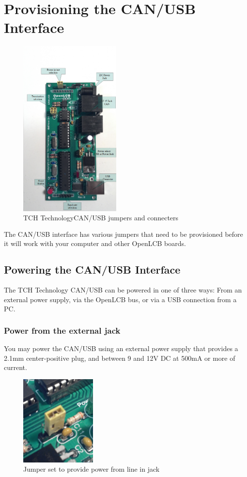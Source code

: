 \documentclass[11pt]{book}
\begin{document}
\chapter{Provisioning the CAN/USB Interface}
\begin{figure}[htbp]
\begin{center}
\includegraphics[width=2in]{images/can_usb_jumpers.png}
\caption{TCH TechnologyCAN/USB jumpers and connecters}
\label{CONNECT}
\end{center}
\end{figure}
The CAN/USB interface has various jumpers that need to be provisioned before it will work with your computer and other OpenLCB boards.

\section{Powering the CAN/USB Interface}
The TCH Technology CAN/USB can be powered in one of three ways: From an external power supply, via the OpenLCB bus, or via a USB connection from a PC.
\subsection{Power from the external jack}
You may power the CAN/USB using an external power supply that provides a 2.1mm center-positive plug, and between 9 and 12V DC at 500mA or more of current. 
\begin{figure}[htbp]
\begin{center}
\includegraphics[width=1.5in]{images/power_line_in.png}
\caption{Jumper set to provide power from line in jack}
\label{CANOUT}
\end{center}
\end{figure}
\end{document}
